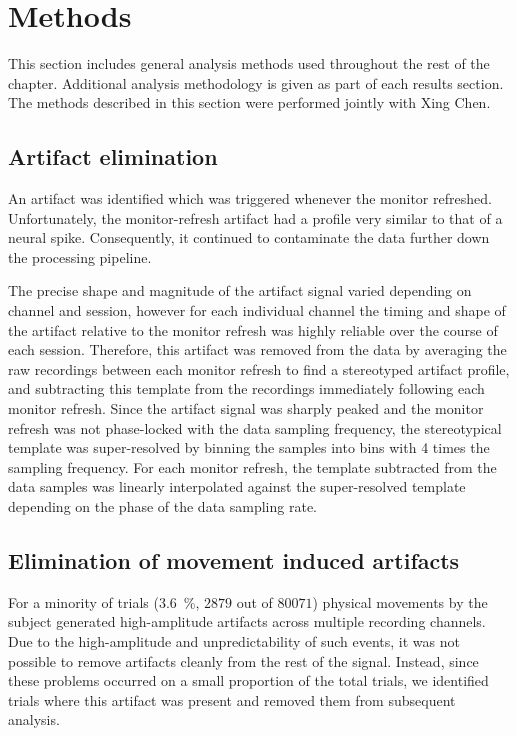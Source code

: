 \section{Methods}
\FloatBarrier

This section includes general analysis methods used throughout the rest of the chapter.
Additional analysis methodology is given as part of each results section.
The methods described in this section were performed jointly with Xing Chen.


\subsection{Artifact elimination}
\label{sec:pl_artifact_elimination}
\label{sec:ma}

An artifact was identified which was triggered whenever the monitor refreshed.
Unfortunately, the monitor-refresh artifact had a profile very similar to that of a neural spike.
Consequently, it continued to contaminate the data further down the processing pipeline.

The precise shape and magnitude of the artifact signal varied depending on channel and session, however for each individual channel the timing and shape of the artifact relative to the monitor refresh was highly reliable over the course of each session.
Therefore, this artifact was removed from the data by averaging the raw recordings between each monitor refresh to find a stereotyped artifact profile, and subtracting this template from the recordings immediately following each monitor refresh.
Since the artifact signal was sharply peaked and the monitor refresh was not phase-locked with the data sampling frequency, the stereotypical template was super-resolved by binning the samples into bins with 4 times the sampling frequency.
For each monitor refresh, the template subtracted from the data samples was linearly interpolated against the super-resolved template depending on the phase of the data sampling rate.


\subsection{Elimination of movement induced artifacts}

For a minority of trials (\SI{3.6}{\percent}, $2879$ out of $80071$) physical movements by the subject generated high-amplitude artifacts across multiple recording channels.
Due to the high-amplitude and unpredictability of such events, it was not possible to remove artifacts cleanly from the rest of the signal.
Instead, since these problems occurred on a small proportion of the total trials, we identified trials where this artifact was present and removed them from subsequent analysis.

